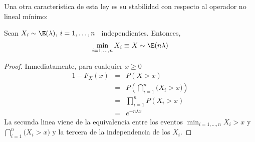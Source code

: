 Una otra caracter\'istica de esta ley  es su stabilidad con respecto al operador
no lineal m\'inimo:
%
\begin{lema}
\label{Lem:MP:StabilidadExponencialMinimo}
%
  Sean  $X_i \sim \E(\lambda), \: i = 1, \ldots , n$ \  independientes. Entonces,
  \[
  \min_{i=1,\ldots,n} X_i \equiv X \sim \E(n \lambda)
  \]
\end{lema}
%
\begin{proof}
Inmediatamente, para cualquier $x \ge 0$
%
\begin{eqnarray*}
1-F_X(x) & = & P(X > x) \\[2mm]
%
& = & P\left( \bigcap_{i=1}^n \big( X_i > x \big) \right)\\[2mm]
%
& = & \prod_{i=1}^n P(X_i > x)\\[2mm]
%
& = & e^{- n \lambda x}
\end{eqnarray*}
%
La   secunda   linea   viene   de   la  equivalencia   entre   los   eventos   $
\min_{i=1,\ldots,n}  X_i >  x$ y  $\bigcap_{i=1}^n  \big( X_i  > x  \big)$ y  la
tercera de la independencia de los $X_i$.
\end{proof}
